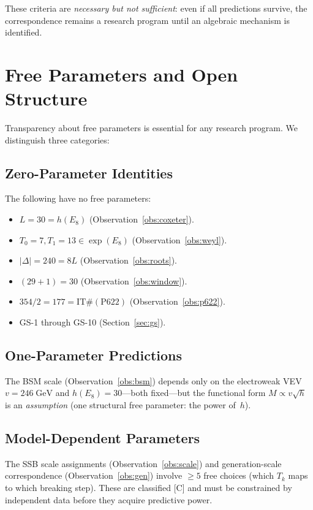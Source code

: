 \documentclass[11pt, a4paper]{article}
\theoremstyle{plain}
\theoremstyle{definition}
\theoremstyle{remark}
\begin{document}
These criteria are \emph{necessary but not sufficient}: even if all
predictions survive, the correspondence remains a research program
until an algebraic mechanism is identified.

\section{Free Parameters and Open Structure}
\label{sec:free}

Transparency about free parameters is essential for any research
program. We distinguish three categories:

\subsection{Zero-Parameter Identities}

The following have no free parameters:
\begin{itemize}
  \item $L = 30 = h(E_8)$ (Observation~\ref{obs:coxeter}).
  \item $T_0 = 7, T_1 = 13 \in \exp(E_8)$ (Observation~\ref{obs:weyl}).
  \item $|\Delta| = 240 = 8L$ (Observation~\ref{obs:roots}).
  \item $(29+1) = 30$ (Observation~\ref{obs:window}).
  \item $354/2 = 177 = \mathrm{IT\#(P622)}$ (Observation~\ref{obs:p622}).
  \item GS-1 through GS-10 (Section~\ref{sec:gs}).
\end{itemize}

\subsection{One-Parameter Predictions}

The BSM scale (Observation~\ref{obs:bsm}) depends only on the
electroweak VEV $v = 246\;\mathrm{GeV}$ and $h(E_8) = 30$---both
fixed---but the functional form $M \propto v\sqrt{h}$ is an
\emph{assumption} (one structural free parameter: the power of~$h$).

\subsection{Model-Dependent Parameters}

The SSB scale assignments (Observation~\ref{obs:scale}) and
generation-scale correspondence (Observation~\ref{obs:gen}) involve
$\geq 5$ free choices (which $T_k$ maps to which breaking step).
These are classified [C] and must be constrained by independent data
before they acquire predictive power.
\end{document}
